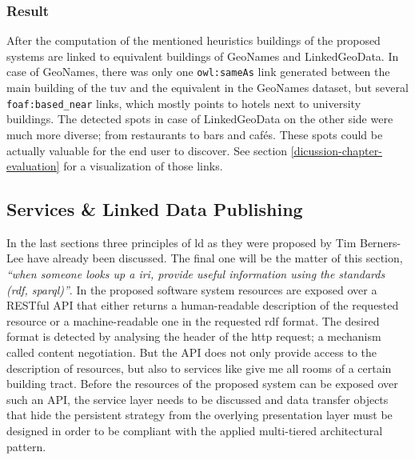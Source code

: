 \documentclass[draft,final]{vutinfth} %
\begin{document}
\subsubsection{Result}
After the computation of the mentioned heuristics buildings of the proposed systems are linked to equivalent buildings of GeoNames and LinkedGeoData. In case of GeoNames, there was only one \texttt{owl:sameAs} link generated between the main building of the \gls{tuv} and the equivalent in the GeoNames dataset, but several \texttt{foaf:based\_near} links, which mostly points to hotels next to university buildings. The detected spots in case of LinkedGeoData on the other side were much more diverse; from restaurants to bars and cafés. These spots could be actually valuable for the end user to discover. See section \ref{dicussion-chapter-evaluation} for a visualization of those links.

\subsection{Services \& Linked Data Publishing}
\label{solution-architectural-prototype:ld-publishing}
In the last sections three principles of \gls{ld} as they were proposed by Tim Berners-Lee have already been discussed. The final one will be the matter of this section, \textit{``when someone looks up a \gls{iri}, provide useful information using the standards (\gls{rdf}, \gls{sparql})''}\cite{berners-lee_linked_2009}. In the proposed software system resources are exposed over a RESTful API that either returns a human-readable description of the requested resource or a machine-readable one in the requested \gls{rdf} format. The desired format is detected by analysing the header of the \gls{http} request; a mechanism called content negotiation. But the API does not only provide access to the description of resources, but also to services like give me all rooms of a certain building tract. Before the resources of the proposed system can be exposed over such an API, the service layer needs to be discussed and data transfer objects that hide the persistent strategy from the overlying presentation layer must be designed in order to be compliant with the applied multi-tiered architectural pattern.
\end{document}
